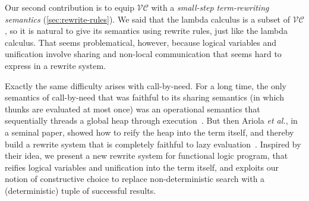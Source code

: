 \documentclass[acmsmall,review,dvipsnames]{acmart}
\newcommand{\etal}{\emph{et al.}}
\newcommand{\versecalc}{$\mathcal{VC}$}
\begin{document}
Our second contribution is to equip \versecalc{} with a
\emph{small-step term-rewriting semantics} (\cref{sec:rewrite-rules}).
We said that the lambda calculus is a subset of \versecalc{}, so it is natural to give its
semantics using rewrite rules, just like the lambda calculus.  That seems problematical, however, because
logical variables and unification involve sharing and non-local communication that seems hard
to express in a rewrite system.

Exactly the same difficulty arises with call-by-need.  For a long time, the only semantics of
call-by-need that was faithful to its sharing semantics (in which thunks are evaluated at most once)
was an operational semantics that sequentially threads a global heap through execution~\cite{launchbury:natural}.
But then Ariola {\etal}, in a seminal paper, showed how to reify the heap into the term itself,
and thereby build a rewrite system that is completely faithful to lazy evaluation~\cite{ariola:call-by-need}.
Inspired by their idea, we present a new rewrite system for functional logic program, that reifies
logical variables and unification into the term itself,
and exploits our notion of constructive choice to replace non-deterministic
search with a (deterministic) tuple of successful results.
\end{document}
